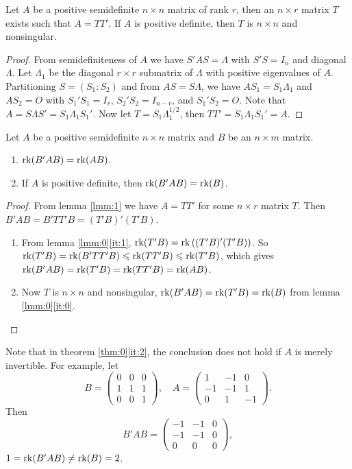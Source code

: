 \begin{lmm}\label{lmm:1}
  Let $A$ be a positive semidefinite $n\times n$ matrix of rank $r$, then an $n\times r$ matrix $T$ exists such that $A = TT'.$ If $A$ is positive definite, then $T$ is $n\times n$ and nonsingular.
\end{lmm}

\begin{proof}
  From semidefiniteness of $A$ we have $S'AS=\Lambda$ with $S'S=I_n$ and diagonal $\Lambda$. Let $\Lambda_1$ be the diagonal $r\times r$ submatrix of $\Lambda$ with positive eigenvalues of $A$. Partitioning $S=(S_1:S_2)$ and from $AS = S\Lambda$, we have $AS_1=S_1\Lambda_1$ and $AS_2=O$ with $S_1'S_1=I_r$, $S_2'S_2=I_{n-r}$, and $S_1'S_2=O$. Note that $A=S\Lambda S'=S_1\Lambda_1 S_1'$. Now let $T=S_1\Lambda_1^{1/2}$, then $TT'=S_1\Lambda_1 S_1'=A$. 
\end{proof}

\begin{thm}\label{thm:0}
  Let $A$ be a positive semidefinite $n\times n$ matrix and $B$ be an $n\times m$ matrix.
  \begin{enumerate}
    \item $\operatorname{rk}(B'AB) = \operatorname{rk}(AB)$.
    \item\label{it:2} If $A$ is positive definite, then $\operatorname{rk}(B'AB) = \operatorname{rk}(B)$.
  \end{enumerate}
\end{thm}

\begin{proof}
  From lemma \ref{lmm:1} we have $A = TT'$ for some $n\times r$ matrix $T$. Then $B'AB = B'TT'B = (T'B)'(T'B)$. 
  \begin{enumerate}
    \item From lemma \ref{lmm:0}\eqref{it:1}, $\operatorname{rk}(T'B) = \operatorname{rk}\left( (T'B)'(T'B) \right)$. So $\operatorname{rk}(T'B) = \operatorname{rk}(B'TT'B)\leqslant\operatorname{rk}(TT'B)\leqslant\operatorname{rk}(T'B)$, which gives $\operatorname{rk}(B'AB)=\operatorname{rk}(T'B)=\operatorname{rk}(TT'B)=\operatorname{rk}(AB)$.
    \item Now $T$ is $n\times n$ and nonsingular, $\operatorname{rk}(B'AB) = \operatorname{rk}(T'B) = \operatorname{rk}(B)$ from lemma \ref{lmm:0}\eqref{it:0}.
  \end{enumerate}
\end{proof}

Note that in theorem \ref{thm:0}\eqref{it:2}, the conclusion does not hold if $A$ is merely invertible. For example, let 
$$B=\begin{pmatrix}0 & 0 & 0\\ 1 & 1 & 1\\0 & 0 & 1\end{pmatrix},\quad A=\begin{pmatrix}1 & -1 & 0\\ -1 & -1 & 1\\0 & 1 & -1\end{pmatrix}.$$ 
Then $$B'AB=\begin{pmatrix}-1 & -1 & 0\\ -1 & -1 & 0\\0 & 0 & 0\end{pmatrix},$$ 
$1=\operatorname{rk}(B'AB)\not=\operatorname{rk}(B)=2$.  
